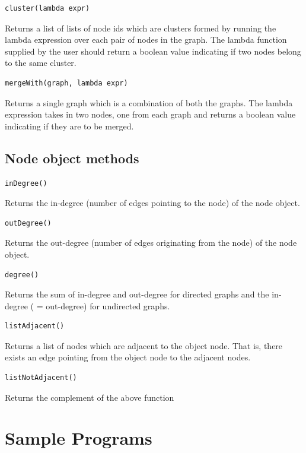 \documentclass[a4paper]{article}
\begin{document}
\newline
\begin{verbatim}cluster(lambda expr)\end{verbatim} Returns a list of lists of node ids which are clusters formed by running the lambda expression over each pair of nodes in the graph. The lambda function supplied by the user should return a boolean value indicating if two nodes belong to the same cluster.
\newline
\begin{verbatim}mergeWith(graph, lambda expr)\end{verbatim} Returns a single graph which is a combination of both the graphs. The lambda expression takes in two nodes, one from each graph and returns a boolean value indicating if they are to be merged.
\newline

\subsection{Node object methods}

\begin{verbatim}inDegree()\end{verbatim} Returns the in-degree (number of edges pointing to the node) of the node object.
\newline
\begin{verbatim}outDegree()\end{verbatim}Returns the out-degree (number of edges originating from the node) of the node object.
\newline
\begin{verbatim}degree()\end{verbatim}Returns the sum of in-degree and out-degree for directed graphs and the in-degree ( = out-degree) for undirected graphs.
\newline
\begin{verbatim}listAdjacent()\end{verbatim} Returns a list of nodes which are adjacent to the object node. That is, there exists an edge pointing from the object node to the adjacent nodes.
\newline
\begin{verbatim}listNotAdjacent()\end{verbatim}Returns the complement of the above function
\newline

\section{Sample Programs}
\end{document}
